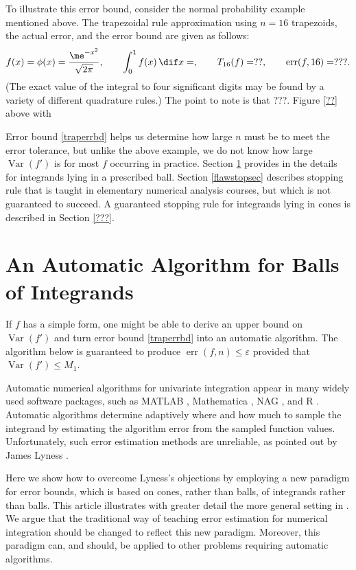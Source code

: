 \documentclass[]{amsart}
\DeclareMathOperator{\Var}{Var}
\DeclareMathOperator{\err}{err}
\theoremstyle{definition}
\theoremstyle{remark}
\begin{document}
To illustrate this error bound, consider the normal probability example mentioned above.  The trapezoidal rule approximation using $n=16$ trapezoids, the actual error, and the error bound are given as follows:
\[
f(x) = \phi(x) = \frac{\me^{-x^2}}{\sqrt{2 \pi}}, \qquad \int_0^1 f(x)  \, \dif x = , \qquad T_{16}(f)= ??, \qquad \err(f,16)=???.
\]
(The exact value of the integral to four significant digits may be found by a variety of different quadrature rules.)  The point to note is that ???.  Figure \ref{??}  above with 

Error bound \eqref{traperrbd} helps us determine how large $n$ must be to meet the error tolerance, but unlike the above example, we do not know how large $\Var(f')$ is for most $f$ occurring in practice. Section \ref{autoballsec} provides in the details for integrands lying in a prescribed ball.  Section \ref{flawstopsec} describes stopping rule that is taught in elementary numerical analysis courses, but which is not guaranteed to succeed.  A guaranteed stopping rule for integrands lying in cones is described in Section \ref{???}.


\section{An Automatic Algorithm for Balls of Integrands} \label{autoballsec}

If $f$ has a simple form, one might be able to derive an upper bound on $\Var(f')$ and turn error bound \eqref{traperrbd} into an automatic algorithm.  The algorithm below is guaranteed to produce $\err(f,n)\le \varepsilon$ provided that $\Var(f') \le M_1$.  

Automatic numerical algorithms for univariate integration appear in many widely used software packages, such as MATLAB , Mathematica , NAG , and R .  Automatic algorithms determine adaptively where and how much to sample the integrand by estimating the algorithm error from the sampled function values.  Unfortunately, such error estimation methods are unreliable, as pointed out by James Lyness .

Here we show how to overcome Lyness's objections by employing a new paradigm for error bounds, which is based on cones, rather than balls, of integrands rather than balls.  This article illustrates with greater detail the more general setting in .  We argue that the traditional way of teaching error estimation for numerical integration should be changed to reflect this new paradigm.  Moreover, this paradigm can, and should, be applied to other problems requiring automatic algorithms. 
\end{document}

